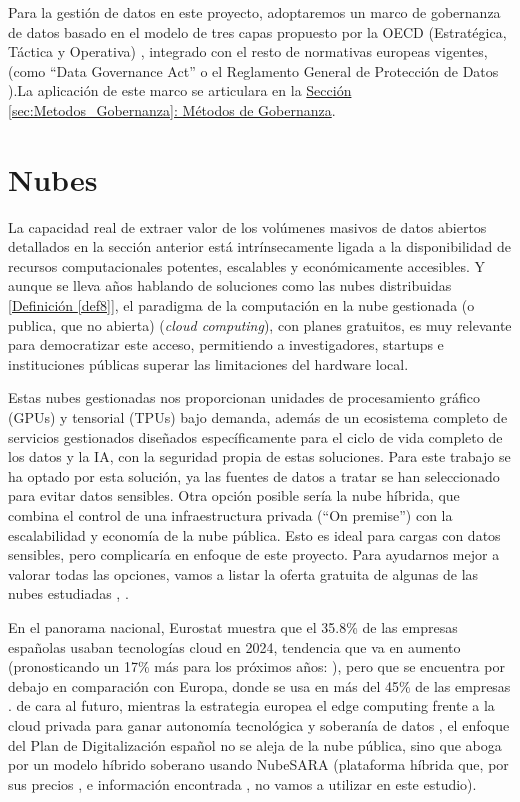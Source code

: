 	Para la gestión de datos en este proyecto, adoptaremos un marco de gobernanza de datos basado en el modelo de tres capas propuesto por la OECD (Estratégica, Táctica y Operativa) \citep{OECD2019}, integrado con el resto de normativas europeas vigentes, (como ``Data Governance Act'' \citep{EU_DGA_2022} o el Reglamento General de Protección de Datos \citep{webRGPD2016Europa}).La aplicación de este marco se articulara en la \hyperref[sec:Metodos_Gobernanza]{Sección \ref*{sec:Metodos_Gobernanza}: Métodos de Gobernanza}. \newpage
	
	
\section{Nubes}
\label{sec:EstudiosNubes}

La capacidad real de extraer valor de los volúmenes masivos de datos abiertos detallados en la sección anterior está intrínsecamente ligada a la disponibilidad de recursos computacionales potentes, escalables y económicamente accesibles. Y aunque se lleva años hablando de soluciones como las nubes distribuidas \hyperref[def8]{[Definición \ref*{def8}]}, el paradigma de la computación en la nube gestionada (o publica, que no abierta) (\textit{cloud computing}), con planes gratuitos, es muy relevante para democratizar este acceso, permitiendo a investigadores, startups e instituciones públicas superar las limitaciones del hardware local.

Estas nubes gestionadas nos proporcionan unidades de procesamiento gráfico (GPUs) y tensorial (TPUs) bajo demanda, además de un ecosistema completo de servicios gestionados diseñados específicamente para el ciclo de vida completo de los datos y la IA, con la seguridad propia de estas soluciones. Para este trabajo se ha optado por esta solución, ya las fuentes de datos a tratar se han seleccionado para evitar datos sensibles. 
Otra opción posible sería la nube híbrida, que combina el control de una infraestructura privada (``On premise'') con la escalabilidad y economía de la nube pública. Esto es ideal para cargas con datos sensibles, pero complicaría en enfoque de este proyecto. 
Para ayudarnos mejor a valorar todas las opciones, vamos a listar la oferta gratuita de algunas de las nubes estudiadas \citep{MicrosoftCloudTerminology}, \citep{lisdorf2021cloud}.

En el panorama nacional, Eurostat muestra que el 35.8\% de las empresas españolas usaban tecnologías cloud en 2024, tendencia que va en aumento (pronosticando un 17\% más para los próximos años: \cite{EspannaCloudGroeth2033}), pero que se encuentra por debajo en comparación con Europa, donde se usa en más del 45\% de las empresas \citep{EurostatCloudUsage}. de cara al futuro, mientras la estrategia europea el edge computing frente a la cloud privada para ganar autonomía tecnológica y soberanía de datos \citep{EuroDigitalStrategyEdge}, el enfoque del Plan de Digitalización español \citep{GobEspana2021PlanDigitalizacion} no se aleja de la nube pública, sino que aboga por un modelo híbrido soberano usando NubeSARA (plataforma híbrida que, por sus precios \citep{EurostatCloudUsage}, e información encontrada \citep{InfoNubeSARA}, \citep{InfoPreparaTICNubeSARA} no vamos a utilizar en este estudio).

